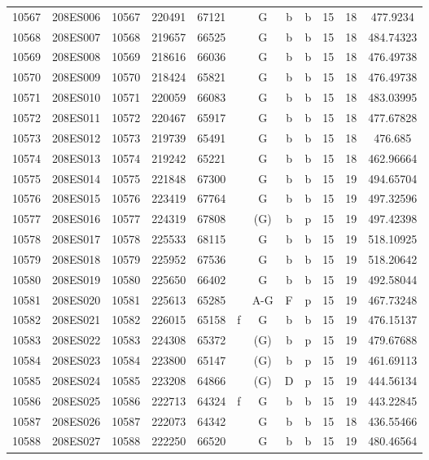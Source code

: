 \begin{tabular}{|*{12}{c|}}
10567 & 208ES006 & 10567 & 220491 & 67121 &  & G & b & b & 15 & 18 & 477.9234 \\ 
10568 & 208ES007 & 10568 & 219657 & 66525 &  & G & b & b & 15 & 18 & 484.74323 \\ 
10569 & 208ES008 & 10569 & 218616 & 66036 &  & G & b & b & 15 & 18 & 476.49738 \\ 
10570 & 208ES009 & 10570 & 218424 & 65821 &  & G & b & b & 15 & 18 & 476.49738 \\ 
10571 & 208ES010 & 10571 & 220059 & 66083 &  & G & b & b & 15 & 18 & 483.03995 \\ 
10572 & 208ES011 & 10572 & 220467 & 65917 &  & G & b & b & 15 & 18 & 477.67828 \\ 
10573 & 208ES012 & 10573 & 219739 & 65491 &  & G & b & b & 15 & 18 & 476.685 \\ 
10574 & 208ES013 & 10574 & 219242 & 65221 &  & G & b & b & 15 & 18 & 462.96664 \\ 
10575 & 208ES014 & 10575 & 221848 & 67300 &  & G & b & b & 15 & 19 & 494.65704 \\ 
10576 & 208ES015 & 10576 & 223419 & 67764 &  & G & b & b & 15 & 19 & 497.32596 \\ 
10577 & 208ES016 & 10577 & 224319 & 67808 &  & (G) & b & p & 15 & 19 & 497.42398 \\ 
10578 & 208ES017 & 10578 & 225533 & 68115 &  & G & b & b & 15 & 19 & 518.10925 \\ 
10579 & 208ES018 & 10579 & 225952 & 67536 &  & G & b & b & 15 & 19 & 518.20642 \\ 
10580 & 208ES019 & 10580 & 225650 & 66402 &  & G & b & b & 15 & 19 & 492.58044 \\ 
10581 & 208ES020 & 10581 & 225613 & 65285 &  & A-G & F & p & 15 & 19 & 467.73248 \\ 
10582 & 208ES021 & 10582 & 226015 & 65158 & f & G & b & b & 15 & 19 & 476.15137 \\ 
10583 & 208ES022 & 10583 & 224308 & 65372 &  & (G) & b & p & 15 & 19 & 479.67688 \\ 
10584 & 208ES023 & 10584 & 223800 & 65147 &  & (G) & b & p & 15 & 19 & 461.69113 \\ 
10585 & 208ES024 & 10585 & 223208 & 64866 &  & (G) & D & p & 15 & 19 & 444.56134 \\ 
10586 & 208ES025 & 10586 & 222713 & 64324 & f & G & b & b & 15 & 19 & 443.22845 \\ 
10587 & 208ES026 & 10587 & 222073 & 64342 &  & G & b & b & 15 & 18 & 436.55466 \\ 
10588 & 208ES027 & 10588 & 222250 & 66520 &  & G & b & b & 15 & 19 & 480.46564 \\ 

\end{tabular}
